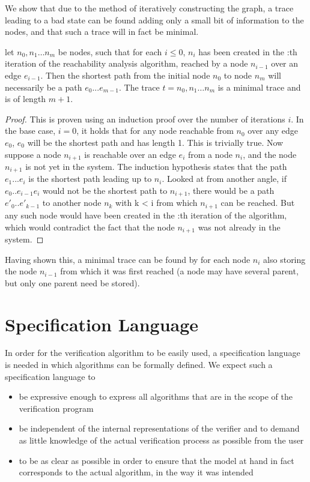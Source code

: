 We show that due to the method of iteratively constructing the graph, a trace leading to a bad state can be found adding only a small bit of information to the nodes, and that such a trace will in fact be minimal.

\begin{lemma}
let $n_0,n_1\ldots n_m$ be nodes, such that for each $i \leq 0$, $n_i$ has been created in the :th iteration of the reachability analysis algorithm, reached by a node $n_{i-1}$ over an edge $e_{i-1}$. Then the shortest path from the initial node $n_0$ to node $n_m$ will necessarily be a path $e_0...e_{m-1}$. The trace $t = n_0,n_1\ldots n_m$ is a minimal trace and is of length $m+1$.
\end{lemma}

\begin{proof}
This is proven using an induction proof over the number of iterations $i$. In the base case, $i=0$, it holds that for any node reachable from $n_0$ over any edge $e_0$, $e_0$ will be the shortest path and has length 1. This is trivially true. Now suppose a node $n_{i+1}$ is reachable over an edge $e_i$ from a node $n_i$, and the node $n_{i+1}$ is not yet in the system. The induction hypothesis states that the path $e_1...e_i$ is the shortest path leading up to $n_i$.
Looked at from another angle, if $e_0..e_{i-1}e_i$ would not be the shortest path to $n_{i+1}$, there would be a path $e'_0..e'_{k-1}$ to another node $n_k$ with k < i from which $n_{i+1}$ can be reached. But any such node would have been created in the :th iteration of the algorithm, which would contradict the fact that the node $n_{i+1}$ was not already in the system.
\end{proof}

Having shown this, a minimal trace can be found by for each node $n_i$ also storing the node $n_{i-1}$ from which it was first reached (a node may have several parent, but only one parent need be stored). 

\newpage
\section{Specification Language}
\label{speclang}
In order for the verification algorithm to be easily used, a specification language is needed in which algorithms can be formally defined. We expect such a specification language to

\begin{itemize}
\item
be expressive enough to express all algorithms that are in the scope of the verification program
\item
be independent of the internal representations of the verifier and to demand as little knowledge of the actual verification process as possible from the user
\item
to be as clear as possible in order to ensure that the model at hand in fact corresponds to the actual algorithm, in the way it was intended
\end{itemize}

